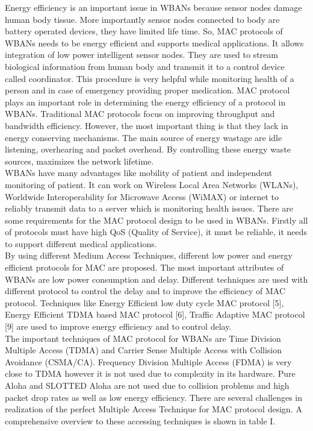 \documentclass[11pt, conference, compsocconf, onecolumn]{IEEEtran}
\begin{document}
Energy efficiency is an important issue in WBANs because sensor nodes damage human body tissue. More importantly sensor nodes connected to body are battery operated devices, they have limited life time. So, MAC protocols of WBANs needs to be energy efficient and supports medical applications. It allows integration of low power intelligent sensor nodes. They are used to stream biological information from human body and transmit it to a control device called coordinator. This procedure is very helpful while monitoring health of a person and in case of emergency providing proper medication. MAC protocol plays an important role in determining the energy efficiency of a protocol in WBANs. Traditional MAC protocols focus on improving throughput and bandwidth efficiency. However, the most important thing is that they lack in energy conserving mechanisms. The main source of energy wastage are idle listening, overhearing and packet overhead. By controlling these energy waste sources, maximizes the network lifetime.
\\
\indent WBANs have many advantages like mobility of patient and independent monitoring of patient. It can work on Wireless Local Area Networks (WLANs), Worldwide Interoperability for Microwave Access (WiMAX) or internet to reliably transmit data to a server which is monitoring health issues. There are some requirements for the MAC protocol design to be used in WBANs. Firstly all of protocols must have high QoS (Quality of Service), it must be reliable, it needs to support different medical applications.
\\
\indent By using different Medium Access Techniques, different low power and energy efficient protocols for MAC are proposed. The most important attributes of WBANs are low power consumption and delay. Different techniques are used with different protocol to control the delay and to improve the efficiency of MAC protocol. Techniques like Energy Efficient low duty cycle MAC protocol [5],  Energy Efficient TDMA based MAC protocol [6], Traffic Adaptive MAC protocol [9] are used to improve energy efficiency and to control delay.
\\
\indent The important techniques of MAC protocol for WBANs are Time Division Multiple Access (TDMA) and Carrier Sense Multiple Access with Collision Avoidance (CSMA/CA). Frequency Division Multiple Access (FDMA) is very close to TDMA however it is not used due to complexity in its hardware. Pure Aloha and SLOTTED Aloha are not used due to collision problems and high packet drop rates as well as low energy efficiency. There are several challenges in realization of the perfect Multiple Access Technique for MAC protocol design. A comprehensive overview to these accessing techniques is shown in table I.
\end{document}
